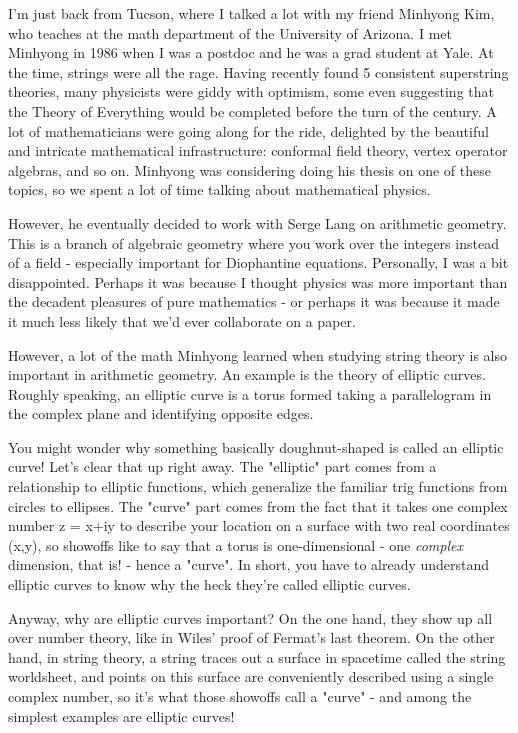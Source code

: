 

I'm just back from Tucson, where I talked a lot with my friend Minhyong
Kim, who teaches at the math department of the University of Arizona.  
I met Minhyong in 1986 when I was a postdoc and he was a grad student at
Yale.   At the time, strings were all the rage.  Having recently found 5
consistent superstring theories, many physicists were giddy with
optimism, some even suggesting that the Theory of Everything would be
completed before the turn of the century.  A lot of mathematicians were
going along for the ride, delighted by the beautiful and intricate
mathematical infrastructure: conformal field theory, vertex operator
algebras, and so on.  Minhyong was considering doing his thesis on one
of these topics, so we spent a lot of time talking about mathematical 
physics.

However, he eventually decided to work with Serge Lang on arithmetic 
geometry.  This is a branch of algebraic geometry where you work over
the integers instead of a field - especially important for Diophantine
equations.  Personally, I was a bit disappointed.  Perhaps it was
because I thought physics was more important than the decadent pleasures
of pure mathematics - or perhaps it was because it made it much less
likely that we'd ever collaborate on a paper.  

However, a lot of the math Minhyong learned when studying string theory
is also important in arithmetic geometry.  An example is the theory of 
elliptic curves.  Roughly speaking, an elliptic curve is a torus formed
taking a parallelogram in the complex plane and identifying opposite
edges.  

You might wonder why something basically doughnut-shaped is called an
elliptic curve!   Let's clear that up right away.  The "elliptic" part
comes from a relationship to elliptic functions, which generalize the
familiar trig functions from circles to ellipses.  The "curve" part
comes from the fact that it takes one complex number z = x+iy to
describe your location on a surface with two real coordinates (x,y), so
showoffs like to say that a torus is one-dimensional - one \emph{complex}
dimension, that is! - hence a "curve".  In short, you have to already
understand elliptic curves to know why the heck they're called elliptic
curves.

Anyway, why are elliptic curves important?  On the one hand, they show
up all over number theory, like in Wiles' proof of Fermat's last 
theorem.   On the other hand, in string theory, a string traces out a
surface in spacetime called the string worldsheet, and points on this
surface are conveniently described using a single complex number, so
it's what those showoffs call a "curve" - and among the simplest
examples are elliptic curves!

